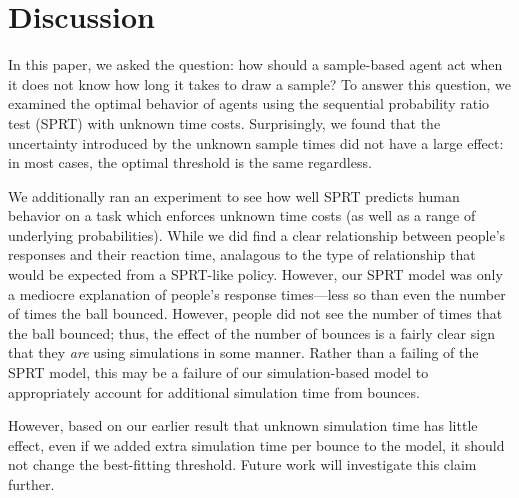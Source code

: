 \documentclass[11pt]{article}
\begin{document}
\section{Discussion}

In this paper, we asked the question: how should a sample-based agent act when it does not know how long it takes to draw a sample? To answer this question, we examined the optimal behavior of agents using the sequential probability ratio test (SPRT) with unknown time costs. Surprisingly, we found that the uncertainty introduced by the unknown sample times did not have a large effect: in most cases, the optimal threshold is the same regardless.

We additionally ran an experiment to see how well SPRT predicts human behavior on a task which enforces unknown time costs (as well as a range of underlying probabilities). While we did find a clear relationship between people's responses and their reaction time, analagous to the type of relationship that would be expected from a SPRT-like policy. However, our SPRT model was only a mediocre explanation of people's response times---less so than even the number of times the ball bounced. However, people did not see the number of times that the ball bounced; thus, the effect of the number of bounces is a fairly clear sign that they \emph{are} using simulations in some manner. Rather than a failing of the SPRT model, this may be a failure of our simulation-based model to appropriately account for additional simulation time from bounces.

However, based on our earlier result that unknown simulation time has little effect, even if we added extra simulation time per bounce to the model, it should not change the best-fitting threshold. Future work will investigate this claim further.


\end{document}
